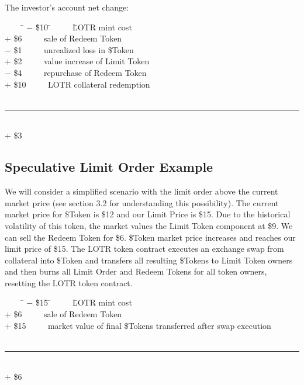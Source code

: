 \documentclass[12pt]{article}
\begin{document}
         The investor's account net change:
         \begin{tabbing}
            ~~~~ \= $-$ \= \$10 \= ~~~~ \= LOTR mint cost \\
            \> $+$ \>\$6 \> ~~~~ \> sale of Redeem Token \\
            \> $-$ \>\$1 \> ~~~~ \> unrealized loss in \$Token \\
            \> $+$ \>\$2 \> ~~~~ \> value increase of Limit Token \\
            \> $-$ \>\$4 \> ~~~~ \> repurchase of Redeem Token \\
            \> $+$ \>\$10 \> ~~~~ \> LOTR collateral redemption \\
            ~~~~ \par\noindent\rule{8cm}{0.4pt} \\
            \> $+$ \>\$3 \\
         \end{tabbing}
      
      \subsection{Speculative Limit Order Example}
         We will consider a simplified scenario with the limit order above the current market price (see section 3.2 for understanding this possibility). The current market price for \$Token is \$12 and our Limit Price is \$15. Due to the historical volatility of this token, the market values the Limit Token component at \$9. We can sell the Redeem Token for \$6. \$Token market price increases and reaches our limit price of \$15. The LOTR token contract executes an exchange swap from collateral into \$Token and transfers all resulting \$Tokens to Limit Token owners and then burns all Limit Order and Redeem Tokens for all token owners, resetting the LOTR token contract.

         \begin{tabbing}
            ~~~~ \= $-$ \= \$15 \= ~~~~ \= LOTR mint cost \\
            \> $+$ \>\$6 \> ~~~~ \> sale of Redeem Token \\
            \> $+$ \>\$15 \> ~~~~ \> market value of final \$Tokens transferred after swap execution \\
            ~~~~ \par\noindent\rule{8cm}{0.4pt} \\
            \> $+$ \>\$6 \\
         \end{tabbing}
\end{document}

